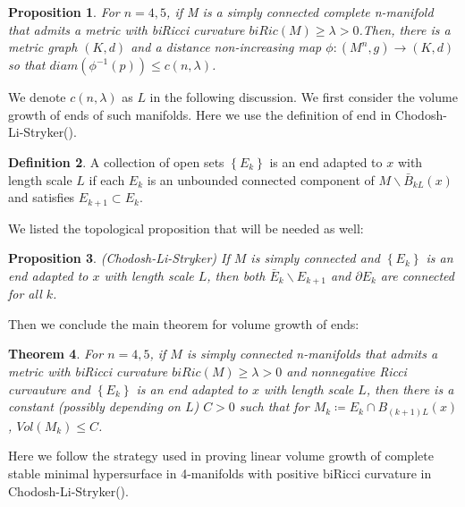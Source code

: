 \documentclass{amsart}
\newtheorem{theorem}{Theorem}[section]
\newtheorem{proposition}[theorem]{Proposition}
\theoremstyle{definition}
\newtheorem{definition}[theorem]{Definition}
\theoremstyle{remark}
\numberwithin{equation}{section}
\begin{document}
\begin{proposition}
    For $n=4,5$, if M is a simply connected complete n-manifold that admits a metric with biRicci curvature $biRic(M)\geq \lambda>0$.Then, there is a metric graph $(K,d)$ and a distance non-increasing map $\phi :(M^{n},g)\rightarrow (K,d)$ so that $diam(\phi^{-1}(p))\leq c(n,\lambda)$.
\end{proposition}

 We denote $c(n,\lambda)$ as $L$ in the following discussion. We first consider the volume growth of ends of such manifolds. Here we use the definition of end in Chodosh-Li-Stryker(\cite{ccd24}).
\begin{definition}
    A collection of open sets $\left\{E_{k}\right\}$ is an end adapted to $x$ with length scale $L$ if each $E_{k}$ is an unbounded connected component of $M\backslash \bar{B}_{kL}(x)$ and satisfies $E_{k+1}\subset E_{k}$.
\end{definition}
We listed the topological proposition that will be needed as well:\\
\begin{proposition}(Chodosh-Li-Stryker\cite{ccd24})
    If $M$ is simply connected and $\left\{E_{k}\right\}$ is an end adapted to $x$ with length scale $L$, then both $\bar{E}_{k}\backslash E_{k+1}$ and $\partial E_{k}$ are connected for all $k$.
\end{proposition}
Then we conclude the main theorem for volume growth of ends:\\
\begin{theorem}
     For $n=4,5$, if $M$ is simply connected n-manifolds that admits a metric with biRicci curvature $biRic(M)\geq \lambda>0$ and nonnegative Ricci curvauture and $\left\{E_{k}\right\}$ is an end adapted to $x$ with length scale $L$, then there is a constant (possibly depending on $L$) $C>0$ such that for $M_{k}\coloneq E_{k}\cap B_{(k+1)L}(x)$, $Vol(M_{k})\leq C$.
\end{theorem}

Here we follow the strategy used in proving linear volume growth of complete stable minimal hypersurface in 4-manifolds with positive biRicci curvature in Chodosh-Li-Stryker(\cite{ccd24}). 
\end{document}
